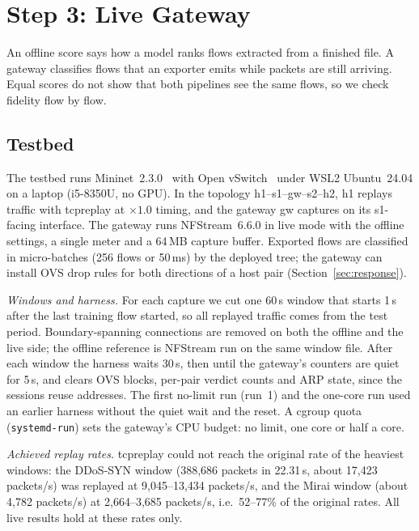 \section{Step 3: Live Gateway}\label{sec:live}

An offline score says how a model ranks flows extracted from a finished file. A gateway classifies flows that an exporter emits while packets are still arriving. Equal scores do not show that both pipelines see the same flows, so we check fidelity flow by flow.

\subsection{Testbed}\label{sec:testbed}

The testbed runs Mininet~2.3.0~\cite{lantz2010mininet} with Open vSwitch~\cite{pfaff2015ovs} under WSL2 Ubuntu~24.04 on a laptop (i5-8350U, no GPU). In the topology h1--s1--gw--s2--h2, h1 replays traffic with tcpreplay at $\times1.0$ timing, and the gateway gw captures on its s1-facing interface. The gateway runs NFStream~6.6.0 in live mode with the offline settings, a single meter and a 64\,MB capture buffer. Exported flows are classified in micro-batches (256 flows or 50\,ms) by the deployed tree; the gateway can install OVS drop rules for both directions of a host pair (Section~\ref{sec:response}).

\emph{Windows and harness.} For each capture we cut one 60\,s window that starts 1\,s after the last training flow started, so all replayed traffic comes from the test period. Boundary-spanning connections are removed on both the offline and the live side; the offline reference is NFStream run on the same window file. After each window the harness waits 30\,s, then until the gateway's counters are quiet for 5\,s, and clears OVS blocks, per-pair verdict counts and ARP state, since the sessions reuse addresses. The first no-limit run (run~1) and the one-core run used an earlier harness without the quiet wait and the reset. A cgroup quota (\texttt{systemd-run}) sets the gateway's CPU budget: no limit, one core or half a core.

\emph{Achieved replay rates.} tcpreplay could not reach the original rate of the heaviest windows: the DDoS-SYN window (388,686 packets in 22.31\,s, about 17,423 packets/s) was replayed at 9,045--13,434 packets/s, and the Mirai window (about 4,782 packets/s) at 2,664--3,685 packets/s, i.e.\ 52--77\% of the original rates. All live results hold at these rates only.

